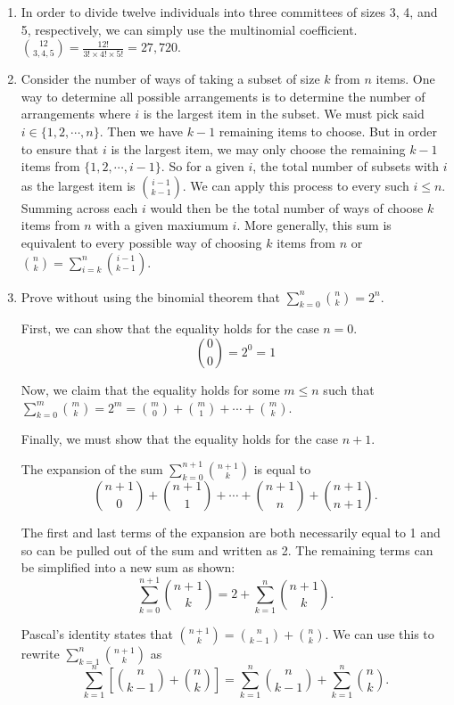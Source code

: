 \documentclass[letterpaper,12pt]{article}
\begin{document}
\begin{enumerate}
\item
In order to divide twelve individuals into three committees of sizes 3, 4, and 5, respectively, we can simply use the multinomial coefficient. ${12 \choose 3,4,5} = \frac{12!}{3! \times 4! \times 5!} = 27,720$.



\item
Consider the number of ways of taking a subset of size $k$ from $n$ items. One way to determine all possible arrangements is to determine the number of arrangements where $i$ is the largest item in the subset. We must pick said $i \in \{1, 2, \cdots, n\}$. Then we have $k-1$ remaining items to choose. But in order to ensure that $i$ is the largest item, we may only choose the remaining $k-1$ items from $\{1, 2, \cdots, i-1\}$. So for a given $i$, the total number of subsets with $i$ as the largest item is ${i-1 \choose k-1}$. We can apply this process to every such $i \le n$. Summing across each $i$ would then be the total number of ways of choose $k$ items from $n$ with a given maxiumum $i$. More generally, this sum is equivalent to every possible way of choosing $k$ items from $n$ or ${n \choose k} = \sum_{i=k}^n{{i-1 \choose k-1}}$.



\item Prove without using the binomial theorem that $\sum_{k=0}^n{n \choose k} = 2^n$.

First, we can show that the equality holds for the case $n = 0$.
\[ {0 \choose 0} = 2^0 = 1 \]

Now, we claim that the equality holds for some $m \le n$ such that $\sum_{k=0}^m{m \choose k} = 2^m = {m \choose 0} + {m \choose 1} + \cdots + {m \choose k}$.

Finally, we must show that the equality holds for the case $n + 1$.

The expansion of the sum $\sum_{k=0}^{n+1}{n+1 \choose k}$ is equal to 
\[ {n+1 \choose 0} + {n+1 \choose 1} + \cdots + {n+1 \choose n} + {n+1 \choose n+1}. \]

The first and last terms of the expansion are both necessarily equal to 1 and so can be pulled out of the sum and written as 2. The remaining terms can be simplified into a new sum as shown:
\[ \sum_{k=0}^{n+1}{n+1 \choose k} = 2 +  \sum_{k=1}^n{n+1 \choose k}. \]

Pascal's identity states that ${n+1 \choose k} = {n \choose k-1} + {n \choose k}$. We can use this to rewrite $\sum_{k=1}^n{n+1 \choose k}$ as 
\[ \sum_{k=1}^n \left[ {n \choose k-1} + {n \choose k} \right] =  \sum_{k=1}^n{n \choose k-1} + \sum_{k=1}^n{n \choose k}. \]


\end{enumerate}
\end{document}
